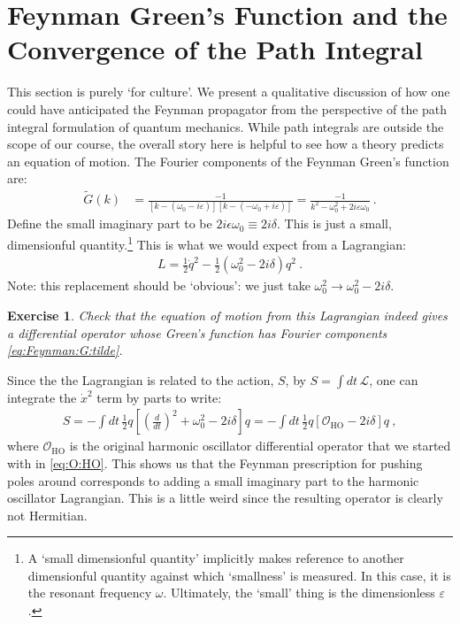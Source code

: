 \documentclass[
  11pt,
	colorful,
	raggedright,
]{tufte-style-thesis-flip}
\newtheorem{exercise}{Exercise}[section]
\begin{document}
\section{Feynman Green's Function and the Convergence of the Path Integral}

This section is purely `for culture'. We present a qualitative discussion of how one could have anticipated the Feynman propagator from the perspective of the path integral formulation of quantum mechanics. While path integrals are outside the scope of our course, the overall story here is helpful to see how a theory predicts an equation of motion. The Fourier components of the Feynman Green's function are:
\begin{align}
  \tilde G(k) &=
  \frac{-1}{
  \left[k-(\omega_0 -i\varepsilon)\right]
  \left[k-(-\omega_0 + i\varepsilon)\right]
  }
  =
  \frac{-1}{
  k^2 - \omega_0^2 + 2i\varepsilon \omega_0
  }
  \ .
  \label{eq:Feynman:G:tilde}
\end{align}
Define the small imaginary part to be $2i\epsilon \omega_0 \equiv 2i\delta$. This is just a small, dimensionful quantity.\footnote{A `small dimensionful quantity' implicitly makes reference to another dimensionful quantity against which `smallness' is measured. In this case, it is the resonant frequency $\omega$. Ultimately, the `small' thing is the dimensionless $\varepsilon$.}  This is what we would expect from a Lagrangian:
\begin{align}
  L = \frac{1}{2}\dot q^2 - \frac{1}{2}\left(\omega_0^2 - 2i \delta\right)q^2 \ .
\end{align}
Note: this replacement should be `obvious': we just take $\omega_0^2 \to \omega_0^2 - 2i\delta$.
\begin{exercise}
Check that the equation of motion from this Lagrangian indeed gives a differential operator whose Green's function has Fourier components \eqref{eq:Feynman:G:tilde}.
\end{exercise}
Since the the Lagrangian is related to the action, $S$, by $S=\int dt\, \mathcal L$, one can integrate the $\dot x^2$ term by parts to write:
\begin{align}
  S = -\int dt \, \frac{1}{2}
  q 
  \left[\left(\frac{d}{dt}\right)^2 + \omega_0^2 - 2i\delta \right]
  q 
  =
  -\int dt \, \frac{1}{2}
  q 
  \left[\mathcal O_\text{HO} - 2i\delta \right]
  q  \ ,
  \label{eq:HO:S:Feynman:quad}
\end{align}
where $\mathcal O_\text{HO}$ is the original harmonic oscillator differential operator that we started with in \eqref{eq:O:HO}. This shows us that the Feynman prescription for pushing poles around corresponds to adding a small imaginary part to the harmonic oscillator Lagrangian. This is a little weird since the resulting operator is clearly not Hermitian.
\end{document}
